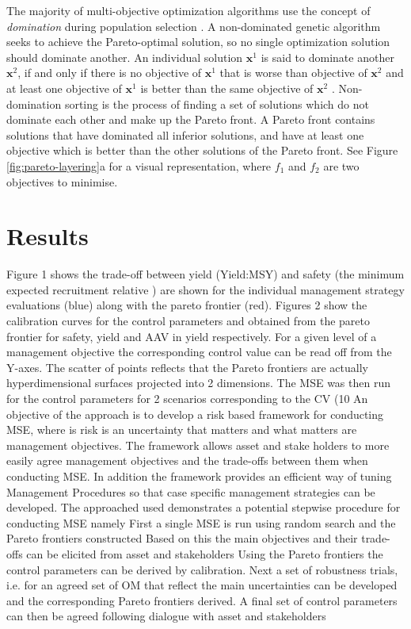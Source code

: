 \documentclass[12pt,doublespacing,a4paper]{ouparticle}
\begin{document}
The majority of multi-objective optimization algorithms use the concept of \emph{domination} during population selection \cite{Burke2014}. A non-dominated genetic algorithm seeks to achieve the Pareto-optimal solution, so no single optimization solution should dominate another. An individual solution $\mathbf{x}^{1}$ is said to dominate another $\mathbf{x}^{2}$, if and only if there is no objective of $\mathbf{x}^{1}$ that is worse than objective of $\mathbf{x}^{2}$ and at least one objective of $\mathbf{x}^{1}$ is better than the same objective of $\mathbf{x}^{2}$ \cite{Bao2017}. Non-domination sorting is the process of finding a set of solutions which do not dominate each other and make up the Pareto front. A Pareto front contains solutions that have dominated all inferior solutions, and have at least one objective which is better than the other solutions of the Pareto front. See Figure \ref{fig:pareto-layering}a for a visual representation, where $f_1$ and $f_2$ are two objectives to minimise.


\section{Results}


Figure 1 shows the trade-off between yield (Yield:MSY) and safety (the minimum expected recruitment relative ) are shown for the individual management strategy evaluations (blue) along with the pareto frontier (red).
Figures 2 show the calibration curves for the control parameters  and  obtained from the pareto frontier for safety, yield and AAV in yield respectively. For a given level of a management objective the corresponding control value can be read off from the Y-axes. The scatter of points reflects that the Pareto frontiers are actually hyperdimensional surfaces projected into 2 dimensions.
The MSE was then run for the control parameters for 2 scenarios corresponding to the CV (10%
An objective of the approach is to develop a risk based framework for conducting MSE, where is risk is an uncertainty that matters and what matters are management objectives.  The framework allows asset and stake holders to more easily agree management objectives and the trade-offs between them when conducting MSE. In addition the framework provides an efficient way of tuning Management Procedures so that case specific management strategies can be developed.
The approached used demonstrates a potential stepwise procedure for conducting MSE namely
First a single MSE is run using random search and the Pareto frontiers constructed
Based on this the main objectives and their trade-offs can be elicited from asset and stakeholders
Using the Pareto frontiers the control parameters can be derived by calibration.
Next a set of robustness trials, i.e. for an agreed set of OM that reflect the main uncertainties can be developed and the corresponding Pareto frontiers derived.
A final set of control parameters can then be agreed following dialogue with asset and stakeholders
\end{document}
